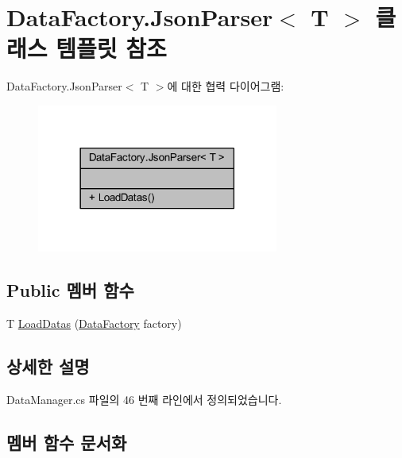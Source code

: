 \hypertarget{class_data_factory_1_1_json_parser}{}\section{Data\+Factory.\+Json\+Parser$<$ T $>$ 클래스 템플릿 참조}
\label{class_data_factory_1_1_json_parser}


Data\+Factory.\+Json\+Parser$<$ T $>$에 대한 협력 다이어그램\+:\nopagebreak
\begin{figure}[H]
\begin{center}
\leavevmode
\includegraphics[width=225pt]{class_data_factory_1_1_json_parser__coll__graph}
\end{center}
\end{figure}
\subsection*{Public 멤버 함수}
\begin{DoxyCompactItemize}
\item 
T \hyperlink{class_data_factory_1_1_json_parser_aef625d66ef24c990b9ddde3a3b3af73d}{Load\+Datas} (\hyperlink{class_data_factory}{Data\+Factory} factory)
\end{DoxyCompactItemize}


\subsection{상세한 설명}


Data\+Manager.\+cs 파일의 46 번째 라인에서 정의되었습니다.



\subsection{멤버 함수 문서화}
